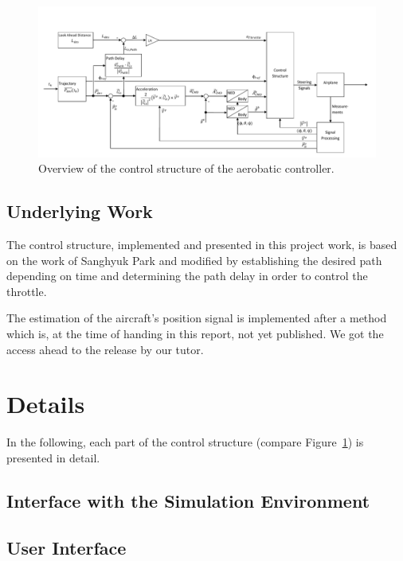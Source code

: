 \documentclass[11pt,a4paper]{scrartcl}		%
\begin{document}
\begin{figure}[!h]
  \begin{center}
  	\includegraphics[width=\textheight, angle=90]{pictures/complete_structure.pdf}
  \end{center}
  \caption{Overview of the control structure of the aerobatic controller.}
  \label{fig_complete_structure}
\end{figure}


\subsection{Underlying Work}

The control structure, implemented and presented in this project work, is based on the work of Sanghyuk Park\cite{Park.2012} and modified by establishing the desired path depending on time and determining the path delay in order to control the throttle.

The estimation of the aircraft's position signal is implemented after a method which is, at the time of handing in this report, not yet published. We got the access ahead to the release by our tutor.

\section{Details}

In the following, each part of the control structure (compare Figure~\ref{fig_complete_structure}) is presented in detail.

\subsection{Interface with the Simulation Environment}

\subsection{User Interface}
\end{document}

